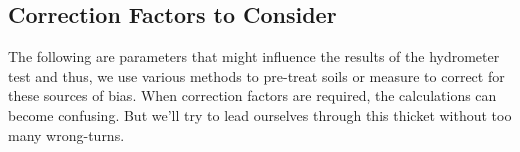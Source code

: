 \documentclass{tufte-handout}
\begin{document}

\subsection{Correction Factors to Consider}

The following are parameters that might influence the results of the hydrometer test and thus, we use various methods to pre-treat soils or measure to correct for these sources of bias. When correction factors are required, the calculations can become confusing.	 But we'll try to lead ourselves through this thicket without too many wrong-turns. 
\end{document}
